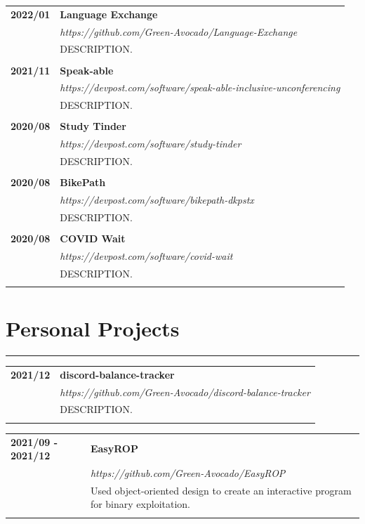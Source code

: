 \documentclass[letterpaper]{article}
\newcommand{\sect}[1]{\section*{#1}
                        {\color{cyan}
                        \rule{\textwidth}{1pt}
                        \vspace{-1ex}}}
\begin{document}
        \begin{tabular}{p{} p{}} 
            \textbf{2022/01} & \large\textbf{Language Exchange} \\
            & \emph{https://github.com/Green-Avocado/Language-Exchange} \\
            & DESCRIPTION. \\
            \\
            \textbf{2021/11} & \large\textbf{Speak-able} \\
            & \emph{https://devpost.com/software/speak-able-inclusive-unconferencing} \\
            & DESCRIPTION. \\
            \\
            \textbf{2020/08} & \large\textbf{Study Tinder} \\
            & \emph{https://devpost.com/software/study-tinder} \\
            & DESCRIPTION. \\
            \\
            \textbf{2020/08} & \large\textbf{BikePath} \\
            & \emph{https://devpost.com/software/bikepath-dkpstx} \\
            & DESCRIPTION. \\
            \\
            \textbf{2020/08} & \large\textbf{COVID Wait} \\
            & \emph{https://devpost.com/software/covid-wait} \\
            & DESCRIPTION. \\
            \\
        \end{tabular}

    \sect{Personal Projects}

        \begin{tabular}{p{} p{}} 
            \textbf{2021/12} & \large\textbf{discord-balance-tracker} \\
            & \emph{https://github.com/Green-Avocado/discord-balance-tracker} \\
            & DESCRIPTION. \\
            \\
        \end{tabular}

        \begin{tabular}{p{} p{}} 
            \textbf{2021/09 - 2021/12} & \large\textbf{EasyROP} \\
            & \emph{https://github.com/Green-Avocado/EasyROP} \\
            & Used object-oriented design to create an interactive program for binary exploitation. \\
            \\
        \end{tabular}
\end{document}

